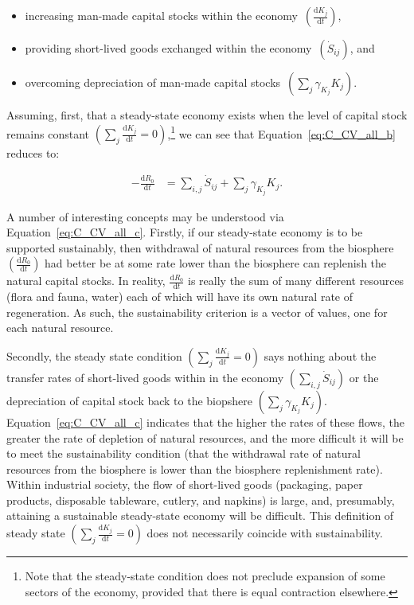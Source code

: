 \begin{itemize}
	\item{increasing man-made capital stocks
	within the economy~$\left(\frac{\mathrm{d}K_{j}}{\mathrm{d}t}\right)$,}
	\item{providing short-lived goods exchanged within the
	economy~$\left(\dot{S}_{ij}\right)$, and}
	\item{overcoming depreciation of man-made
	capital stocks~$\left(\sum_{j}\gamma_{K_{j}}K_{j}\right)$.}
\end{itemize}

Assuming,
first,
that a steady-state economy exists when the level
of capital stock remains constant
$\left(\sum_{j}\frac{\mathrm{d}K_{j}}{\mathrm{d}t}=0\right)$,\footnote{Note
that the steady-state condition does not preclude expansion
of some sectors of the economy, provided that there is 
equal contraction elsewhere.}
we can see that Equation~\ref{eq:C_CV_all_b}
reduces to:

\begin{align}\label{eq:C_CV_all_c}
	- \frac{\mathrm{d}R_{0}}{\mathrm{d}t}										&
	= \sum_{i,j}\dot{S}_{ij}
	+ \sum_{j}\gamma_{K_{j}}K_{j}.
\end{align}

A number of interesting concepts may be understood via
Equation~\ref{eq:C_CV_all_c}. 
Firstly,
if our steady-state economy is to be supported
sustainably,
then withdrawal of natural resources from the biosphere
$\left(\frac{\mathrm{d}R_{0}}{\mathrm{d}t}\right)$
had better be at some rate lower than the biosphere
can replenish the natural capital stocks. 
In reality, 
$\frac{\mathrm{d}R_{0}}{\mathrm{d}t}$
is really the sum of many different resources
(flora and fauna, water) each of which will have
its own natural rate of regeneration.
As such, 
the sustainability criterion  is a vector of values,
one for each natural resource.

Secondly,
the steady state condition 
$\left(\sum_{j}\frac{\mathrm{d}K_{j}}{\mathrm{d}t}=0\right)$
says nothing about the transfer rates of short-lived goods 
within in the economy $\left(\sum_{i,j}\dot{S}_{ij}\right)$
or the depreciation of capital stock back to the biopshere
$\left(\sum_{j}\gamma_{K_{j}}K_{j}\right)$.
Equation~\ref{eq:C_CV_all_c} indicates that 
the higher the rates of these flows,
the greater the rate of depletion of
natural resources, and the more difficult it will be to
meet the sustainability condition 
(that the withdrawal rate of natural resources from the biosphere
is lower than the biosphere
replenishment rate).
Within industrial society,
the flow of short-lived goods 
(packaging,
paper products,
disposable tableware,
cutlery,
and napkins)
is large,
and, presumably, attaining a sustainable steady-state economy
will be difficult.
This definition of steady state 
$\left(\sum_{j}\frac{\mathrm{d}K_{j}}{\mathrm{d}t}=0\right)$
does not necessarily coincide with sustainability.

